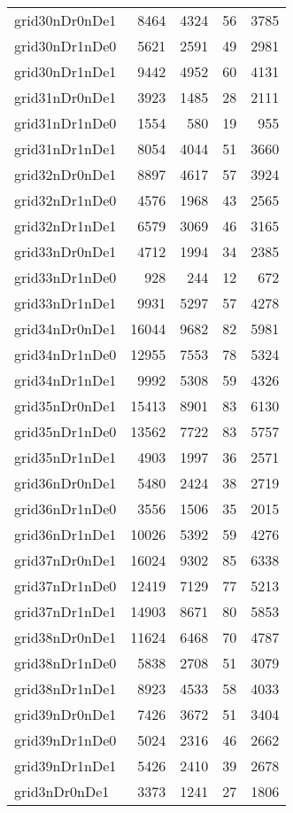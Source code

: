 \begin{longtable}{lrrrr}
grid30nDr0nDe1 & 8464 & 4324 & 56 & 3785 \\
grid30nDr1nDe0 & 5621 & 2591 & 49 & 2981 \\
grid30nDr1nDe1 & 9442 & 4952 & 60 & 4131 \\
grid31nDr0nDe1 & 3923 & 1485 & 28 & 2111 \\
grid31nDr1nDe0 & 1554 & 580 & 19 & 955 \\
grid31nDr1nDe1 & 8054 & 4044 & 51 & 3660 \\
grid32nDr0nDe1 & 8897 & 4617 & 57 & 3924 \\
grid32nDr1nDe0 & 4576 & 1968 & 43 & 2565 \\
grid32nDr1nDe1 & 6579 & 3069 & 46 & 3165 \\
grid33nDr0nDe1 & 4712 & 1994 & 34 & 2385 \\
grid33nDr1nDe0 & 928 & 244 & 12 & 672 \\
grid33nDr1nDe1 & 9931 & 5297 & 57 & 4278 \\
grid34nDr0nDe1 & 16044 & 9682 & 82 & 5981 \\
grid34nDr1nDe0 & 12955 & 7553 & 78 & 5324 \\
grid34nDr1nDe1 & 9992 & 5308 & 59 & 4326 \\
grid35nDr0nDe1 & 15413 & 8901 & 83 & 6130 \\
grid35nDr1nDe0 & 13562 & 7722 & 83 & 5757 \\
grid35nDr1nDe1 & 4903 & 1997 & 36 & 2571 \\
grid36nDr0nDe1 & 5480 & 2424 & 38 & 2719 \\
grid36nDr1nDe0 & 3556 & 1506 & 35 & 2015 \\
grid36nDr1nDe1 & 10026 & 5392 & 59 & 4276 \\
grid37nDr0nDe1 & 16024 & 9302 & 85 & 6338 \\
grid37nDr1nDe0 & 12419 & 7129 & 77 & 5213 \\
grid37nDr1nDe1 & 14903 & 8671 & 80 & 5853 \\
grid38nDr0nDe1 & 11624 & 6468 & 70 & 4787 \\
grid38nDr1nDe0 & 5838 & 2708 & 51 & 3079 \\
grid38nDr1nDe1 & 8923 & 4533 & 58 & 4033 \\
grid39nDr0nDe1 & 7426 & 3672 & 51 & 3404 \\
grid39nDr1nDe0 & 5024 & 2316 & 46 & 2662 \\
grid39nDr1nDe1 & 5426 & 2410 & 39 & 2678 \\
grid3nDr0nDe1 & 3373 & 1241 & 27 & 1806 \\

\end{longtable}
